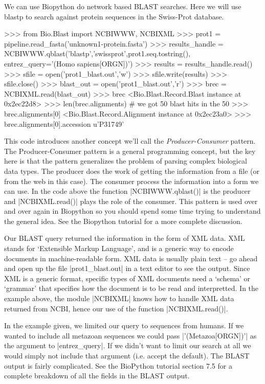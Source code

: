 \documentclass[10pt,letterpaper]{scrartcl}
\begin{document}
We can use Biopython do network based BLAST searches. Here we will use blastp to search against protein sequences in the Swiss-Prot database.

\begin{python}
>>> from Bio.Blast import NCBIWWW, NCBIXML
>>> prot1 = pipeline.read_fasta('unknown1-protein.fasta')
>>> results_handle = NCBIWWW.qblast('blastp','swissprot',prot1.seq.tostring(), entrez_query='(Homo sapiens[ORGN])')
>>> results = results_handle.read()
>>> sfile = open('prot1_blast.out','w')
>>> sfile.write(results)
>>> sfile.close()
>>> blast_out = open('prot1_blast.out','r')
>>> brec = NCBIXML.read(blast_out)
>>> brec
<Bio.Blast.Record.Blast instance at 0x2ec22d8>
>>> len(brec.alignments) # we got 50 blast hits in the 
50
>>> brec.alignments[0]
<Bio.Blast.Record.Alignment instance at 0x2ec23a0>
>>> brec.alignments[0].accession
u'P31749'    
\end{python}

This code introduces another concept we'll call the \emph{Producer-Consumer} pattern. The Producer-Consumer pattern is a general programming concept, but the key here is that the pattern generalizes the problem of parsing complex biological data types. The producer does the work of getting the information from a file (or from the web in this case). The consumer process the information into a form we can use. In the code above the function |NCBIWWW.qblast()| is the producer and |NCBIXML.read()| plays the role of the consumer. This pattern is used over and over again in Biopython so you should spend some time trying to understand the general idea. See the Biopython tutorial for a more complete discussion.

Our BLAST query returned the information in the form of XML data.  XML stands for `Extensible Markup Language', and is a generic way to encode documents in machine-readable form.  XML data is usually plain text -- go ahead and open up the file |prot1_blast.out| in a text editor to see the output. Since XML is a generic format, specific types of XML documents need a `schema' or `grammar' that specifies how the document is to be read and interpretted. In the example above, the module |NCBIXML| knows how to handle XML data returned from NCBI, hence our use of the function |NCBIXML.read()|.

In the example given, we limited our query to sequences from humans. If we wanted to include all metazoan sequences we could pass |'(Metazoa[ORGN])'| as the argument to |entrez_query|. If we didn't want to limit our search at all we would simply not include that argument (i.e. accept the default). The BLAST output is fairly complicated. See the BioPython tutorial section 7.5 for a complete breakdown of all the fields in the BLAST output.
\end{document}
